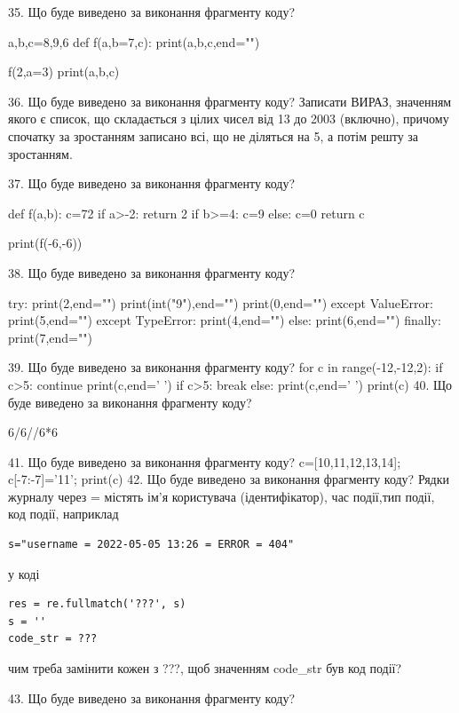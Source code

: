 \documentclass[11pt]{article}
\begin{document}
35. Що буде виведено за виконання фрагменту коду?

a,b,c=8,9,6
def f(a,b=7,c):
    print(a,b,c,end="")

f(2,a=3)
print(a,b,c)


36. Що буде виведено за виконання фрагменту коду?
Записати ВИРАЗ, значенням якого є список, що складається з цілих чисел від 13 до 2003 (включно), причому спочатку за зростанням записано всі, що не діляться на 5, а потім решту за зростанням.

37. Що буде виведено за виконання фрагменту коду?

def f(a,b):
    c=72
    if a>-2:
        return 2
    if b>=4:
         c=9
    else: 
        c=0
    return c

print(f(-6,-6))

38. Що буде виведено за виконання фрагменту коду?

try:
    print(2,end="")
    print(int("9"),end="")
    print(0,end="")
except ValueError: print(5,end="")
except TypeError: print(4,end="")
else: print(6,end="")
finally: print(7,end="")


39. Що буде виведено за виконання фрагменту коду?
for c in range(-12,-12,2):
     if c>5: continue
     print(c,end=' ')
     if c>5: break
   else: print(c,end=' ')
   print(c)
40. Що буде виведено за виконання фрагменту коду?

6/6//6*6

41. Що буде виведено за виконання фрагменту коду?
c=[10,11,12,13,14]; c[-7:-7]='11'; print(c)
42. Що буде виведено за виконання фрагменту коду?
Рядки журналу через = містять ім'я користувача (ідентифікатор), час події,тип події, код події, наприклад
\begin{verbatim}
s="username = 2022-05-05 13:26 = ERROR = 404"
\end{verbatim}
у коді 
\begin{verbatim}
res = re.fullmatch('???', s) 
s = ''
code_str = ??? 
\end{verbatim}
чим треба замінити кожен з ???, щоб значенням code\_str був код події? 



43. Що буде виведено за виконання фрагменту коду?
\end{document}
